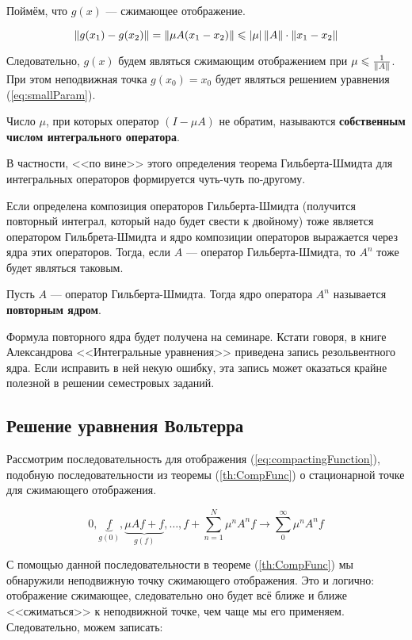 \documentclass[12pt]{article}
\begin{document}
		Поймём, что $g(x)$ --- сжимающее отображение.
	
		$$\left\| g(x_1) - g(x_2) \right\| = \left\| \mu A(x_1 - x_2) \right\| \leqslant \left| \mu \right| \left\| A \right\| \cdot \left\| x_1 - x_2 \right\|$$
	
		Следовательно, $g(x)$ будем являться сжимающим отображением при $\mu \leqslant \frac{1}{\left\| A \right\|}$. При этом
		неподвижная точка $g(x_0) = x_0$ будет являться решением уравнения (\ref{eq:smallParam}).
	
		\begin{defi}
			Число $\mu$, при которых оператор $(I - \mu A)$ не обратим, называются \textbf{собственным числом
			интегрального оператора}.
		\end{defi}
	
		В частности, <<по вине>> этого определения теорема Гильберта-Шмидта для интегральных операторов формируется
		чуть-чуть по-другому.
	
		Если определена композиция операторов Гильберта-Шмидта (получится повторный интеграл, который надо будет 
		свести к двойному) тоже является оператором Гильбрета-Шмидта и ядро композиции операторов выражается 
		через ядра этих операторов. Тогда, если $A$ --- оператор Гильберта-Шмидта, то $A^n$ тоже будет являться
		таковым.
	
		\begin{defi}
			Пусть $A$ --- оператор Гильберта-Шмидта. Тогда ядро оператора $A^n$ называется \textbf{повторным ядром}.
		\end{defi}
	
		{\footnotesize
		Формула повторного ядра будет получена на семинаре. Кстати говоря, в книге Александрова <<Интегральные уравнения>>
		приведена запись резольвентного ядра. Если исправить в ней некую ошибку, эта запись может оказаться крайне полезной
		в решении семестровых заданий.\par
		}

	\subsection{Решение уравнения Вольтерра}

		Рассмотрим последовательность для отображения (\ref{eq:compactingFunction}), подобную последовательности
		из теоремы (\ref{th:CompFunc}) о стационарной точке для сжимающего отображения.
	
		$$0, \underbrace{f}_{g(0)}, \underbrace{\mu Af + f}_{g(f)}, \ldots, f + \sum_{n=1}^N \mu^nA^nf \rightarrow \sum_0^{\infty} \mu^nA^n f$$

		С помощью данной последовательности в теореме (\ref{th:CompFunc}) мы обнаружили неподвижную точку
		сжимающего отображения. {\color{gray} Это и логично: отображение сжимающее, следовательно оно будет
		всё ближе и ближе <<сжиматься>> к неподвижной точке, чем чаще мы его применяем.} Следовательно, можем
		записать:
\end{document}
